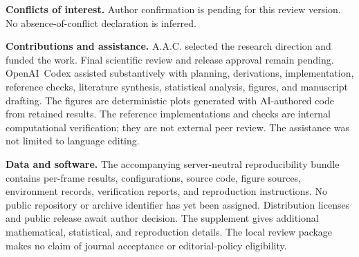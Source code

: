 \documentclass[10pt,a4paper,twocolumn]{article}
\begin{document}
\textbf{Conflicts of interest.} Author confirmation is pending for this review version. No absence-of-conflict declaration is inferred.

\textbf{Contributions and assistance.} A.A.C. selected the research direction and funded the work. Final scientific review and release approval remain pending. \mbox{OpenAI Codex} assisted substantively with planning, derivations, implementation, reference checks, literature synthesis, statistical analysis, figures, and manuscript drafting. The figures are deterministic plots generated with AI-authored code from retained results. The reference implementations and checks are internal computational verification; they are not external peer review. The assistance was not limited to language editing.

\textbf{Data and software.} The accompanying server-neutral reproducibility bundle contains per-frame results, configurations, source code, figure sources, environment records, verification reports, and reproduction instructions. No public repository or archive identifier has yet been assigned. Distribution licenses and public release await author decision. The supplement gives additional mathematical, statistical, and reproduction details. The local review package makes no claim of journal acceptance or editorial-policy eligibility.


\begingroup{}

\endgroup
\end{document}
